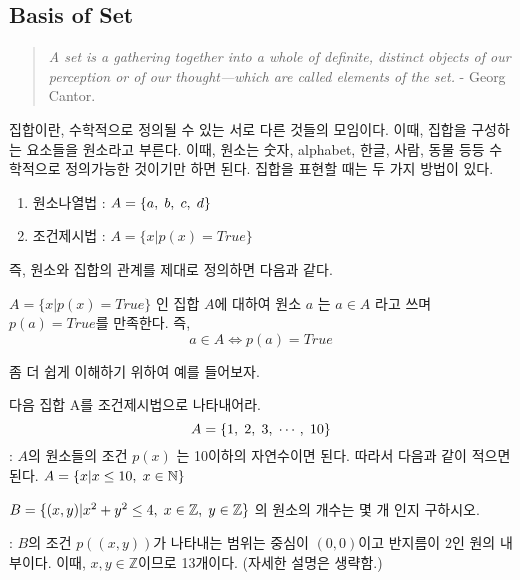 \documentclass[paper=a4, fontsize=11pt]{scrartcl} %
\numberwithin{equation}{section} %
\numberwithin{figure}{section} %
\numberwithin{table}{section} %
\theoremstyle{plain}
\newcommand{\bigdef}[2]{\index{#1}\begin{dfn} {\rm #2} \end{dfn}}
\newcommand{\Com}{,\Hs}
\newcommand{\Hs}{\hspace{0.1cm}}
\newcommand{\HS}{\hspace{0.5cm}}
\newcommand{\VS}{\vspace{0.3cm}}
\newcommand{\Set}[1]{\{ #1 \}}
\newcommand{\CSet}[2][x]{\{#1 | #2 \}}
\newcommand{\N}{\mathbb{N}}
\newcommand{\Z}{\mathbb{Z}}
\begin{document}
\subsection{Basis of Set}

\onehalfspacing
\VS
\begin{quote}
 \textit{A set is a gathering together into a whole of definite, distinct objects of our perception or of our thought—which are called elements of the set.}
 \HS - Georg Cantor.
\end{quote}

\vspace{0.3cm}
\HS 집합이란, 수학적으로 정의될 수 있는 서로 다른 것들의 모임이다. 이때, 집합을 구성하는 요소들을 원소라고 부른다. 이때, 원소는 숫자, alphabet, 한글, 사람, 동물 등등 수학적으로 정의가능한 것이기만 하면 된다.
집합을 표현할 때는 두 가지 방법이 있다.

\begin{enumerate}
 \item 원소나열법 : $A = \Set{a\Com b\Com c\Com d}$
 \item 조건제시법 : $A = \CSet[x]{p(x) = True}$
\end{enumerate}

\vspace{0.3cm}
즉, 원소와 집합의 관계를 제대로 정의하면 다음과 같다.

\bigdef{1}{
$A = \CSet{p(x) = True}$ 인 집합 $A$에 대하여 원소 $a$ 는 $a \in A$ 라고 쓰며 $p(a)=True$를 만족한다. 즉, 
 \begin{equation*}
  a \in A \Leftrightarrow p(a) = True
 \end{equation*}
}

좀 더 쉽게 이해하기 위하여 예를 들어보자.
\begin{exmp}
 다음 집합 A를 조건제시법으로 나타내어라.
 \begin{equation*}
  A = \Set{1\Com2\Com3\Com\cdots\Com10}
 \end{equation*}
 \textnormal{: $A$의 원소들의 조건 $p(x)$ 는 10이하의 자연수이면 된다. 따라서 다음과 같이 적으면 된다.}
 $A = \CSet{x\leq10\Com x\in\N}$
\end{exmp}

\vspace{0.2cm}

\begin{exmp}
 $B = \CSet[(x,y)]{x^2 + y^2 \leq 4\Com x\in\Z\Com y\in\Z}$ 의 원소의 개수는 몇 개 인지 구하시오.
 
 \VS
 
 \textnormal{: $B$의 조건 $p((x,y))$가 나타내는 범위는 중심이 $(0,0)$이고 반지름이 $2$인 원의 내부이다. 이때, $x,y\in\Z$이므로 13개이다. 
 (자세한 설명은 생략함.)}
\end{exmp}
\pagebreak
\end{document}

